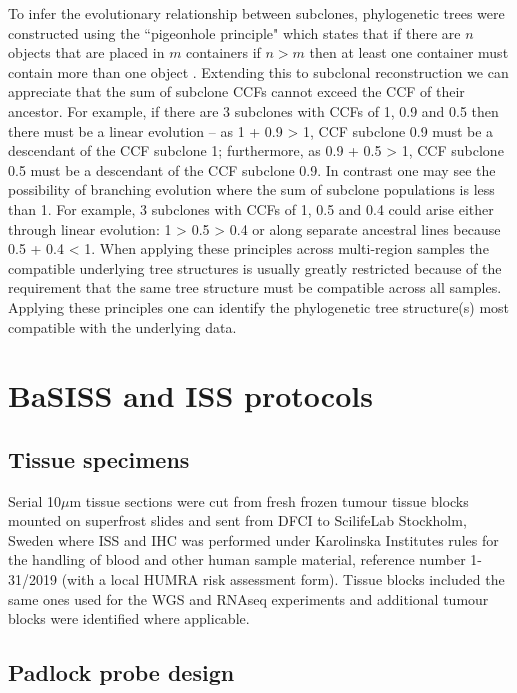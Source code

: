 To infer the evolutionary relationship between subclones, phylogenetic trees were constructed using the ``pigeonhole principle" which states that if there are $n$ objects that are placed in $m$ containers if $n > m$ then at least one container must contain more than one object . Extending this to subclonal reconstruction we can appreciate that the sum of subclone \acp{CCF} cannot exceed the \ac{CCF} of their ancestor. For example, if there are 3 subclones with \acp{CCF} of 1, 0.9 and 0.5 then there must be a linear evolution – as 1 + 0.9 > 1, \ac{CCF} subclone 0.9 must be a descendant of the \ac{CCF} subclone 1; furthermore, as 0.9 + 0.5 > 1, \ac{CCF} subclone 0.5 must be a descendant of the \ac{CCF} subclone 0.9. In contrast one may see the possibility of branching evolution where the sum of subclone populations is less than 1. For example, 3 subclones with \acp{CCF} of 1, 0.5 and 0.4 could arise either through linear evolution: 1 > 0.5 > 0.4 or along separate ancestral lines because 0.5 + 0.4 < 1. When applying these principles across multi-region samples the compatible underlying tree structures is usually greatly restricted because of the requirement that the same tree structure must be compatible across all samples. Applying these principles one can identify the phylogenetic tree structure(s) most compatible with the underlying data. 

\section{\acs{BaSISS} and \acs{ISS} protocols}
\label{sec:protocol-suppl-basiss-iss}

\subsection{Tissue specimens}
Serial 10$\mu$m tissue sections were cut from fresh frozen tumour tissue blocks mounted on superfrost slides and sent from DFCI to ScilifeLab Stockholm, Sweden where \ac{ISS} and \ac{IHC} was performed under Karolinska Institutes rules for the handling of blood and other human sample material, reference number 1-31/2019 (with a local HUMRA risk assessment form). Tissue blocks included the same ones used for the \ac{WGS} and RNAseq experiments and additional tumour blocks were identified where applicable.

\subsection{Padlock probe design}

